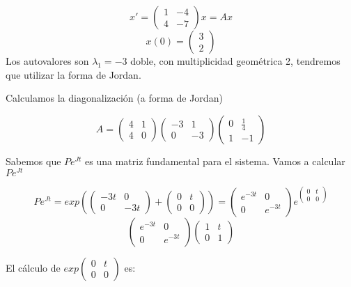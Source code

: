 \documentclass[nochap]{apuntes}
\begin{document}
\begin{problem}[25]
\[x'=\begin{pmatrix}
1&-4\\4&-7
\end{pmatrix}x = Ax\]
\[x(0) = \begin{pmatrix}
3\\2
\end{pmatrix}\]
\solution
Los autovalores son $\lambda_1 = -3$ doble, con multiplicidad geométrica 2, tendremos que utilizar la forma de Jordan.

Calculamos la diagonalización (a forma de Jordan)

\[A= \begin{pmatrix}
4&1\\4&0
\end{pmatrix}
\begin{pmatrix}
-3&1\\0&-3
\end{pmatrix}
\begin{pmatrix}
0 &\frac{1}{4}\\1&-1
\end{pmatrix}\]

Sabemos que $Pe^{Jt}$ es una matriz fundamental para el sistema.
Vamos a calcular $Pe^{Jt}$ 

\[Pe^{Jt} = exp\left({\begin{pmatrix}
-3t&0\\0&-3t
\end{pmatrix} + \begin{pmatrix}
0&t\\0&0
\end{pmatrix}}\right) = \begin{pmatrix}
e^{-3t}&0\\0&e^{-3t}
\end{pmatrix} e^{\begin{pmatrix}
0&t\\0&0
\end{pmatrix}}\]
\[
\begin{pmatrix}
e^{-3t}&0\\0&e^{-3t}
\end{pmatrix}\begin{pmatrix}
1&t\\0&1
\end{pmatrix}
\]

El cálculo de $\displaystyle exp \begin{pmatrix}
0&t\\0&0
\end{pmatrix}$ es:


\end{problem}
\end{document}
